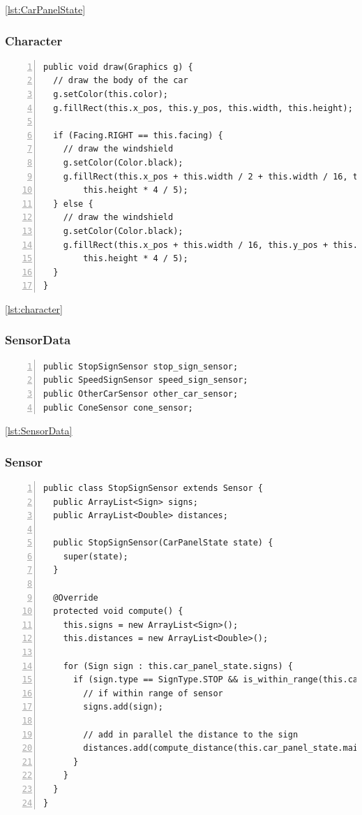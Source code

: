 \documentclass{article} %
\begin{document}
\ref{lst:CarPanelState}

\subsubsection{Character}
\begin{lstlisting}[caption={Sample Implementation of a Character},label={lst:character},numbers=left]
public void draw(Graphics g) {
  // draw the body of the car
  g.setColor(this.color);
  g.fillRect(this.x_pos, this.y_pos, this.width, this.height);

  if (Facing.RIGHT == this.facing) {
    // draw the windshield
    g.setColor(Color.black);
    g.fillRect(this.x_pos + this.width / 2 + this.width / 16, this.y_pos + this.height / 10, this.width / 3,
        this.height * 4 / 5);
  } else {
    // draw the windshield
    g.setColor(Color.black);
    g.fillRect(this.x_pos + this.width / 16, this.y_pos + this.height / 10, this.width / 3,
        this.height * 4 / 5);
  }
}
\end{lstlisting}

\ref{lst:character}

\subsubsection{SensorData}
\begin{lstlisting}[caption={Sensor Data maintains a number of sensors},label={lst:SensorData},numbers=left]
public StopSignSensor stop_sign_sensor;
public SpeedSignSensor speed_sign_sensor;
public OtherCarSensor other_car_sensor;
public ConeSensor cone_sensor;
\end{lstlisting}

\ref{lst:SensorData}

\subsubsection{Sensor}
\begin{lstlisting}[float=*,caption={Implementation of Sensor},label={lst:sensor},numbers=left]
public class StopSignSensor extends Sensor {
  public ArrayList<Sign> signs;
  public ArrayList<Double> distances;

  public StopSignSensor(CarPanelState state) {
    super(state);
  }

  @Override
  protected void compute() {
    this.signs = new ArrayList<Sign>();
    this.distances = new ArrayList<Double>();

    for (Sign sign : this.car_panel_state.signs) {
      if (sign.type == SignType.STOP && is_within_range(this.car_panel_state.main_car, sign)) {
        // if within range of sensor
        signs.add(sign);

        // add in parallel the distance to the sign
        distances.add(compute_distance(this.car_panel_state.main_car, sign));
      }
    }
  }
}
\end{lstlisting}
\end{document}
